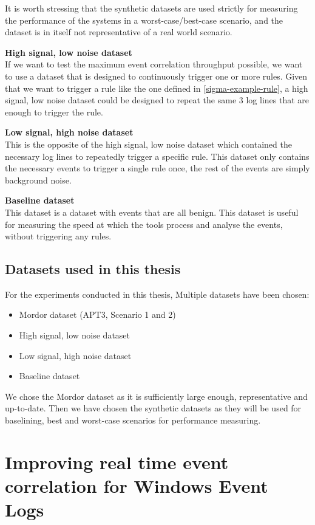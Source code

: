 It is worth stressing that the synthetic datasets are used strictly for measuring the performance of the systems in a worst-case/best-case scenario, and the dataset is in itself not representative of a real world scenario.

\textbf{High signal, low noise dataset}\\
If we want to test the maximum event correlation throughput possible, we want to use a dataset that is designed to continuously trigger one or more rules. Given that we want to trigger a rule like the one defined in \cref{sigma-example-rule}, a high signal, low noise dataset could be designed to repeat the same 3 log lines that are enough to trigger the rule. 

\textbf{Low signal, high noise dataset}\\
This is the opposite of the high signal, low noise dataset which contained the necessary log lines to repeatedly trigger a specific rule. This dataset only contains the necessary events to trigger a single rule once, the rest of the events are simply background noise.

\textbf{Baseline dataset}\\
This dataset is a dataset with events that are all benign. This dataset is useful for measuring the speed at which the tools process and analyse the events, without triggering any rules.

\subsection{Datasets used in this thesis}
\label{sec:datasets-used}

For the experiments conducted in this thesis, Multiple datasets have been chosen:

\begin{itemize}
    \item Mordor dataset (APT3, Scenario 1 and 2)
    \item High signal, low noise dataset
    \item Low signal, high noise dataset
    \item Baseline dataset
\end{itemize}
We chose the Mordor dataset as it is sufficiently large enough, representative and up-to-date. Then we have chosen the synthetic datasets as they will be used for baselining, best and worst-case scenarios for performance measuring.

\section{Improving real time event correlation for Windows Event Logs}
\label{sec:improving-real-time-event-correlation-for-windows-event-logs}

